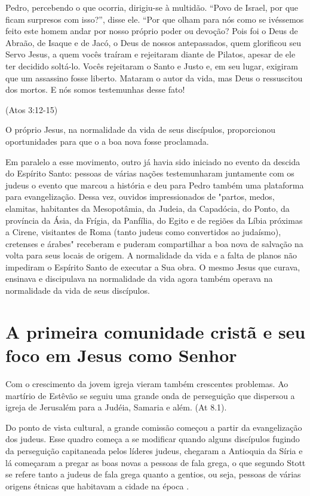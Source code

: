 \documentclass[
	12pt,				%
	openright,			%
	twoside,			%
	a4paper,			%
	english,			%
	french,				%
	spanish,			%
	brazil				%
	]{abntex2}
\begin{document}
\begin{citacao}
	Pedro, percebendo o que ocorria, dirigiu-se à multidão. “Povo de Israel, por que ficam surpresos com isso?”, disse ele. “Por que olham para nós como se ivéssemos feito este homem andar por nosso próprio poder ou devoção? Pois foi o Deus de Abraão, de Isaque e de Jacó, o Deus de nossos antepassados, quem glorificou seu Servo Jesus, a quem vocês traíram e rejeitaram diante de Pilatos,
	apesar de ele ter decidido soltá-lo. Vocês rejeitaram o Santo e Justo e, em seu lugar, exigiram que um assassino fosse liberto. Mataram o autor da vida, mas Deus o ressuscitou dos mortos. E nós somos testemunhas desse fato!
\end{citacao}(Atos 3:12-15)

O próprio Jesus, na normalidade da vida de seus discípulos, proporcionou oportunidades para que o a boa nova fosse proclamada. 

Em paralelo a esse movimento, outro já havia sido iniciado no evento da descida do Espírito Santo: pessoas de várias nações testemunharam juntamente com os judeus o evento que marcou a história e deu para Pedro também uma plataforma para evangelização. Dessa vez, ouvidos impressionados de "partos, medos, elamitas, habitantes da Mesopotâmia, da Judeia, da Capadócia, do Ponto, da província da Ásia, da Frígia, da Panfília, do Egito e de regiões da Líbia próximas a Cirene, visitantes de Roma (tanto judeus como convertidos ao judaísmo), cretenses e árabes" receberam e puderam compartilhar a boa nova de salvação na volta para seus locais de origem. A normalidade da vida e a falta de planos não impediram o Espírito Santo de executar a Sua obra. O mesmo Jesus que curava, ensinava e discipulava na normalidade da vida agora também operava na normalidade da vida de seus discípulos.

\section{A primeira comunidade cristã e seu foco em Jesus como Senhor}

Com o crescimento da jovem igreja vieram também crescentes problemas. Ao martírio de Estêvão se seguiu uma grande onda de perseguição que dispersou a igreja de Jerusalém para a Judéia, Samaria e além. (At 8.1).

Do ponto de vista cultural, a grande comissão começou a partir da evangelização dos judeus. Esse quadro começa a se modificar quando alguns discípulos fugindo da perseguição capitaneada pelos líderes judeus, chegaram a Antioquia da Síria e lá começaram a pregar as boas novas a pessoas de fala grega, o que segundo Stott se refere tanto a judeus de fala grega quanto a gentios, ou seja, pessoas de várias origens étnicas que habitavam a cidade na época \cite[184]{stott}.
\end{document}
